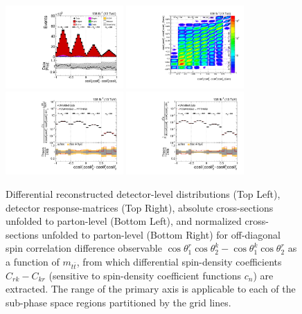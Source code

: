 \clearpage
\begin{figure}[htb]
\begin{center}
 \includegraphics[width=0.40\textwidth]{fig_fullRun2UL/controlplots/combined/Hyp_LLBarCMrk_vs_TTBarMass.pdf}
 \includegraphics[width=0.40\textwidth]{fig_fullRun2UL/unfolding/combined/ResponseMatrix_c_Mrk_mttbar.pdf} \\
 \includegraphics[width=0.40\textwidth]{fig_fullRun2UL/unfolding/combined/UnfoldedResults_c_Mrk_mttbar.pdf}
 \includegraphics[width=0.40\textwidth]{fig_fullRun2UL/unfolding/combined/UnfoldedResultsNorm_c_Mrk_mttbar.pdf} \\
\label{fig:c_Mrk_mttbar}
\caption{Differential reconstructed detector-level distributions (Top Left), detector response-matrices (Top Right), absolute cross-sections unfolded to parton-level (Bottom Left), and normalized cross-sections unfolded to parton-level (Bottom Right) for off-diagonal spin correlation difference observable $\cos\theta_{1}^{r}\cos\theta_{2}^{k}-\cos\theta_{1}^{k}\cos\theta_{2}^{r}$ as a function of $m_{t\bar{t}}$, from which differential spin-density coefficients $C_{rk}-C_{kr}$ (sensitive to spin-density coefficient functions $c_n$) are extracted.  The range of the primary axis is applicable to each of the sub-phase space regions partitioned by the grid lines.}
\end{center}
\end{figure}
